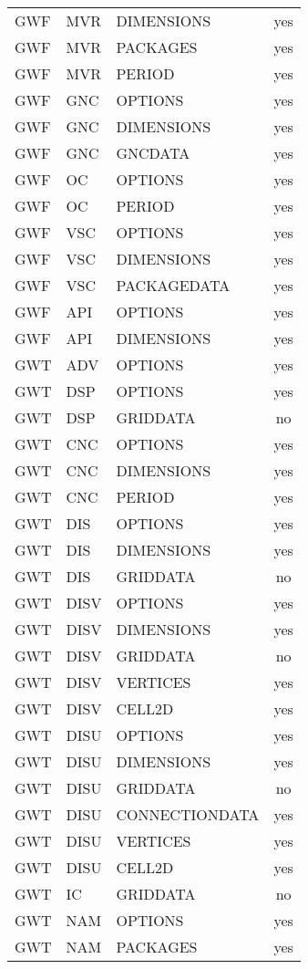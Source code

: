 \begin{longtable}{p{1.5cm} p{1.5cm} p{3cm} c}
GWF & MVR & DIMENSIONS & yes \\ 
GWF & MVR & PACKAGES & yes \\ 
GWF & MVR & PERIOD & yes \\ 
\hline
GWF & GNC & OPTIONS & yes \\ 
GWF & GNC & DIMENSIONS & yes \\ 
GWF & GNC & GNCDATA & yes \\ 
\hline
GWF & OC & OPTIONS & yes \\ 
GWF & OC & PERIOD & yes \\ 
\hline
GWF & VSC & OPTIONS & yes \\ 
GWF & VSC & DIMENSIONS & yes \\ 
GWF & VSC & PACKAGEDATA & yes \\ 
\hline
GWF & API & OPTIONS & yes \\ 
GWF & API & DIMENSIONS & yes \\ 
\hline
GWT & ADV & OPTIONS & yes \\ 
\hline
GWT & DSP & OPTIONS & yes \\ 
GWT & DSP & GRIDDATA & no \\ 
\hline
GWT & CNC & OPTIONS & yes \\ 
GWT & CNC & DIMENSIONS & yes \\ 
GWT & CNC & PERIOD & yes \\ 
\hline
GWT & DIS & OPTIONS & yes \\ 
GWT & DIS & DIMENSIONS & yes \\ 
GWT & DIS & GRIDDATA & no \\ 
\hline
GWT & DISV & OPTIONS & yes \\ 
GWT & DISV & DIMENSIONS & yes \\ 
GWT & DISV & GRIDDATA & no \\ 
GWT & DISV & VERTICES & yes \\ 
GWT & DISV & CELL2D & yes \\ 
\hline
GWT & DISU & OPTIONS & yes \\ 
GWT & DISU & DIMENSIONS & yes \\ 
GWT & DISU & GRIDDATA & no \\ 
GWT & DISU & CONNECTIONDATA & yes \\ 
GWT & DISU & VERTICES & yes \\ 
GWT & DISU & CELL2D & yes \\ 
\hline
GWT & IC & GRIDDATA & no \\ 
\hline
GWT & NAM & OPTIONS & yes \\ 
GWT & NAM & PACKAGES & yes \\ 

\end{longtable}

